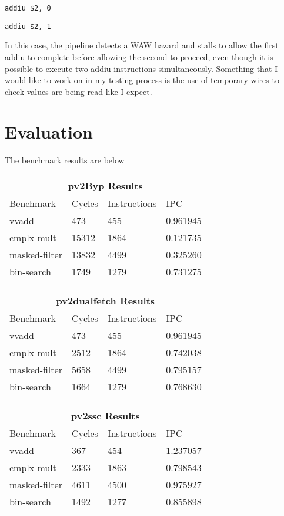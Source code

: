 \documentclass[a4paper, 12pt]{article}
\begin{document}
\begin{center}
\texttt{addiu \$2, 0 }

\texttt{addiu \$2, 1}
\end{center}

In this case, the pipeline detects a WAW hazard and stalls to allow the first addiu to complete before allowing the second to proceed, even though it is possible to execute two addiu instructions simultaneously. Something that I would like to work on in my testing process is the use of temporary wires to check values are being read like I expect.

\section{Evaluation}
The benchmark results are below

\begin{center}
\begin{tabular}{ |p{3cm}|p{3cm}|p{3cm}|p{4.5cm}|  }
 \hline
 \multicolumn{4}{|c|}{pv2Byp Results} \\
 \hline
 Benchmark & Cycles & Instructions & IPC  \\
 \hline
 vvadd & 473 & 455 & 0.961945 \\
 cmplx-mult & 15312 & 1864 & 0.121735 \\
 masked-filter & 13832 & 4499 & 0.325260 \\
 bin-search & 1749 & 1279 & 0.731275 \\
 \hline
\end{tabular}
\end{center}


\begin{center}
\begin{tabular}{ |p{3cm}|p{3cm}|p{3cm}|p{4.5cm}|  }
 \hline
 \multicolumn{4}{|c|}{pv2dualfetch Results} \\
 \hline
 Benchmark & Cycles & Instructions & IPC  \\
 \hline
 vvadd & 473 & 455 & 0.961945 \\
 cmplx-mult & 2512 & 1864 & 0.742038 \\
 masked-filter & 5658 & 4499 & 0.795157 \\
 bin-search & 1664 & 1279 & 0.768630 \\
 \hline
\end{tabular}
\end{center}

\begin{center}
\begin{tabular}{ |p{3cm}|p{3cm}|p{3cm}|p{4.5cm}|  }
 \hline
 \multicolumn{4}{|c|}{pv2ssc	 Results} \\
 \hline
 Benchmark & Cycles & Instructions & IPC  \\
 \hline
 vvadd & 367 & 454 & 1.237057 \\
 cmplx-mult & 2333 & 1863 & 0.798543 \\
 masked-filter & 4611 & 4500 & 0.975927 \\
 bin-search & 1492 & 1277 & 0.855898 \\
 \hline
\end{tabular}
\end{center}
\end{document}
